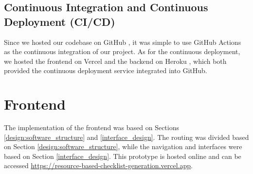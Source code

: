 \subsection{Continuous Integration and Continuous Deployment (CI/CD)}

Since we hosted our codebase on GitHub \cite{github}, it was simple to use GitHub Actions \cite{githubactions} as the continuous integration of our project. As for the continuous deployment, we hosted the frontend on Vercel \cite{vercel} and the backend on Heroku \cite{heroku}, which both provided the continuous deployment service integrated into GitHub.









\section{Frontend}
\label{im:frontend}
The implementation of the frontend was based on Sections \ref{design:software_structure} and \ref{interface_design}. The routing was divided based on Section \ref{design:software_structure}, while the navigation and interfaces were based on Section \ref{interface_design}.
This prototype is hosted online and can be accessed \href{https://resource-based-checklist-generation.vercel.app/}{https://resource-based-checklist-generation.vercel.app}.

